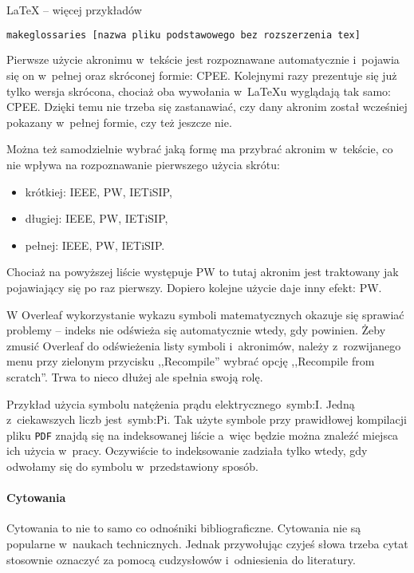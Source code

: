 \begin{easyappendix}{\LaTeX{} -- więcej przykładów}
\begin{lstlisting}[language=bash,
	numbers=none,
	caption=Wygenerowanie listy skrótów i~symboli,
	label={lst:gloss}]
	makeglossaries [nazwa pliku podstawowego bez rozszerzenia tex]
\end{lstlisting}

Pierwsze użycie akronimu w~tekście jest rozpoznawane automatycznie i~pojawia się on w~pełnej oraz skróconej formie: \gls{CPEE}. Kolejnymi razy prezentuje się już tylko wersja skrócona, chociaż oba wywołania w~\LaTeX{u} wyglądają tak samo: \gls{CPEE}. Dzięki temu nie trzeba się zastanawiać, czy dany akronim został wcześniej pokazany w~pełnej formie, czy też jeszcze nie.

Można też samodzielnie wybrać jaką formę ma przybrać akronim w~tekście, co nie wpływa na rozpoznawanie pierwszego użycia skrótu:
\begin{itemize}
	\item krótkiej: \acrshort{IEEE}, \acrshort{PW}, \acrshort{IETiSIP},
	\item długiej: \acrlong{IEEE}, \acrlong{PW}, \acrlong{IETiSIP},
	\item pełnej: \acrfull{IEEE}, \acrfull{PW}, \acrfull{IETiSIP}.
\end{itemize}

Chociaż na powyższej liście występuje \gls{PW} to tutaj akronim jest traktowany jak pojawiający się po raz pierwszy. Dopiero kolejne użycie daje inny efekt: \gls{PW}.

W Overleaf wykorzystanie wykazu symboli matematycznych okazuje się sprawiać problemy -- indeks nie odświeża się automatycznie wtedy, gdy powinien. Żeby zmusić Overleaf do odświeżenia listy symboli i~akronimów, należy z~rozwijanego menu przy zielonym przycisku ,,Recompile'' wybrać opcję ,,Recompile from scratch''. Trwa to nieco dłużej ale spełnia swoją rolę.

Przykład użycia symbolu natężenia prądu elektrycznego~\gls{symb:I}. Jedną z~ciekawszych liczb jest~\gls{symb:Pi}. Tak użyte symbole przy prawidłowej kompilacji pliku \texttt{PDF} znajdą się na indeksowanej liście a~więc będzie można znaleźć miejsca ich użycia w~pracy. Oczywiście to indeksowanie zadziała tylko wtedy, gdy odwołamy się do symbolu w~przedstawiony sposób.

\paragraph{Cytowania}
Cytowania to nie to samo co odnośniki bibliograficzne. Cytowania nie są popularne w~naukach technicznych. Jednak przywołując czyjeś słowa trzeba cytat stosownie oznaczyć za pomocą cudzysłowów i~odniesienia do literatury.


\end{easyappendix}
